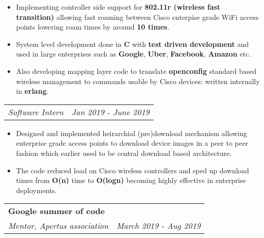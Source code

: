 \documentclass[a4paper,6pt]{article}
\begin{document}
\small
\begin{itemize}
	\itemsep0em
	\item Implementing controller side support for \textcolor{mygray}{\textbf{802.11r (wireless fast transition)}} allowing fast roaming between Cisco enterpise grade WiFi access points lowering roam times by around \textcolor{mygray}{\textbf{10 times}}.
	\item System level development done in \textcolor{mygray}{\textbf{C}} with \textcolor{mygray}{\textbf{test driven development}} and used in large enterprises such as \textcolor{mygray}{\textbf{Google}}, \textcolor{mygray}{\textbf{Uber}}, \textcolor{mygray}{\textbf{Facebook}}, \textcolor{mygray}{\textbf{Amazon}} etc.
    \item Also developing mapping layer code to translate \textcolor{mygray}{\textbf{openconfig}} standard based wireless management to commands usable by Cisco devices: written internally in \textcolor{mygray}{\textbf{erlang}}. 
\end{itemize}

\normalsize
\vspace{2px}
\hspace{5px}
\begin{tabularx}{\textwidth}{X r}
	\textit{\small Software Intern}& \textit{Jan 2019 - June 2019} \\
\end{tabularx}

\small
\begin{itemize}
	\itemsep0em
    \item Designed and implemented heirarchial (pre)download mechanism allowing enterprise grade access points to download device images in a peer to peer fashion which earlier used to be central download based architecture. 
    \item The code reduced load on Cisco wireless controllers and sped up download times from \textcolor{mygray}{\textbf{O(n)}} time to \textcolor{mygray}{\textbf{O(logn)}} becoming highly effective in enterprise deployments.
\end{itemize}

\normalsize
\vspace{6px}
\hspace{5px}
\begin{tabularx}{\textwidth}{X r}
	\large{\textbf{Google summer of code}} &  \\
	\textit{\small Mentor, Apertus association}& \textit{March 2019 - Aug 2019} \\
\end{tabularx}
\end{document}

